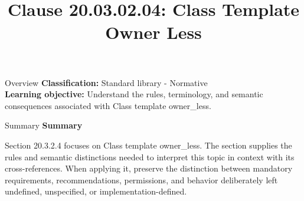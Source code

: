 \documentclass[10pt,letterpaper]{article}
\title{Clause 20.03.02.04: Class Template Owner Less}
\author{}
\date{}
\begin{document}
\maketitle
\begin{CornellOverviewBox}{Overview}
\textbf{Classification:} Standard library - Normative\\[2pt]
\textbf{Learning objective:} Understand the rules, terminology, and semantic consequences associated with Class template owner\_less.
\end{CornellOverviewBox}\begin{CornellSummaryBox}{Summary}
{\sffamily\bfseries\color{Accent} Summary}\par\vspace{3pt}Section 20.3.2.4 focuses on Class template owner\_less. The section supplies the rules and semantic distinctions needed to interpret this topic in context with its cross-references. When applying it, preserve the distinction between mandatory requirements, recommendations, permissions, and behavior deliberately left undefined, unspecified, or implementation-defined.
\end{CornellSummaryBox}
\end{document}
